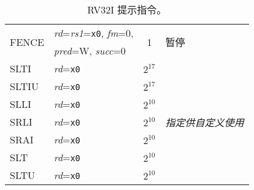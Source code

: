 \begin{table}[hbt]
\begin{tabular}{|l|l|c|l|}
  \multirow{2}{*}{FENCE}& {\em rd}={\em rs1}={\tt x0}, {\em fm}=0,    & \multirow{2}{*}{1}          & \multirow{2}{*}{暂停} \\
                        & {\em pred}=W, {\em succ}=0                  &                             & \\ \hline \hline
  SLTI                  & {\em rd}={\tt x0}                           & $2^{17}$                    & \multirow{7}{*}{\em 指定供自定义使用} \\ \cline{1-3}
  SLTIU                 & {\em rd}={\tt x0}                           & $2^{17}$                    & \\ \cline{1-3}
  SLLI                  & {\em rd}={\tt x0}                           & $2^{10}$                    & \\ \cline{1-3}
  SRLI                  & {\em rd}={\tt x0}                           & $2^{10}$                    & \\ \cline{1-3}
  SRAI                  & {\em rd}={\tt x0}                           & $2^{10}$                    & \\ \cline{1-3}
  SLT                   & {\em rd}={\tt x0}                           & $2^{10}$                    & \\ \cline{1-3}
  SLTU                  & {\em rd}={\tt x0}                           & $2^{10}$                    & \\ \hline
\end{tabular}
\caption{RV32I 提示指令。}
\label{tab:rv32i-hints}
\end{table}

